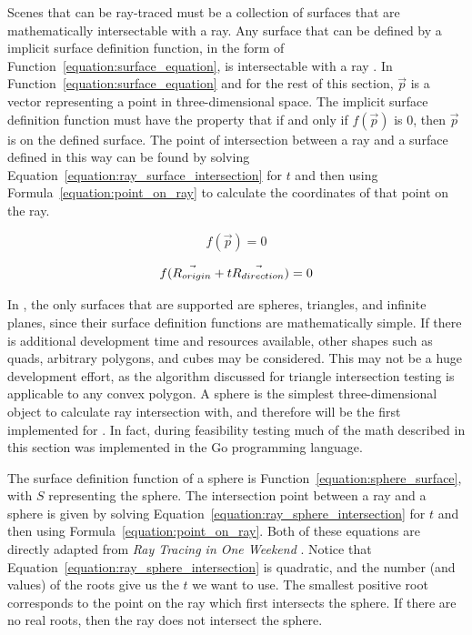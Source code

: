 Scenes that can be ray-traced must be a collection of surfaces that are mathematically intersectable with a ray.
Any surface that can be defined by a implicit surface definition function, in the form of Function~\ref{equation:surface_equation}, is intersectable with a ray \cite{pharr2016physically}.
In Function~\ref{equation:surface_equation} and for the rest of this section, $\vec{p}$ is a vector representing a point in three-dimensional space.
The implicit surface definition function must have the property that if and only if $f(\vec{p})$ is $0$, then $\vec{p}$ is on the defined surface.
The point of intersection between a ray and a surface defined in this way can be found by solving Equation~\ref{equation:ray_surface_intersection} for $t$ and then using Formula~\ref{equation:point_on_ray} to calculate the coordinates of that point on the ray.

\begin{equation}
  \label{equation:surface_equation}
  f(\vec{p}) = 0
\end{equation}

\begin{equation}
  \label{equation:ray_surface_intersection}
  f(\vec{R_{origin}} + t\vec{R_{direction}}) = 0
\end{equation}

In \name, the only surfaces that are supported are spheres, triangles, and infinite planes, since their surface definition functions are mathematically simple.
If there is additional development time and resources available, other shapes such as quads, arbitrary polygons, and cubes may be considered.
This may not be a huge development effort, as the algorithm discussed for triangle intersection testing is applicable to any convex polygon.
A sphere is the simplest three-dimensional object to calculate ray intersection with, and therefore will be the first implemented for \name.
In fact, during feasibility testing much of the math described in this section was implemented in the Go programming language.


The surface definition function of a sphere is Function~\ref{equation:sphere_surface}, with $S$ representing the sphere.
The intersection point between a ray and a sphere is given by solving Equation~\ref{equation:ray_sphere_intersection} for $t$ and then using Formula~\ref{equation:point_on_ray}.
Both of these equations are directly adapted from {\it Ray Tracing in One Weekend} \cite{shirley2016ray}.
Notice that Equation~\ref{equation:ray_sphere_intersection} is quadratic, and the number (and values) of the roots give us the $t$ we want to use.
The smallest positive root corresponds to the point on the ray which first intersects the sphere.
If there are no real roots, then the ray does not intersect the sphere.

